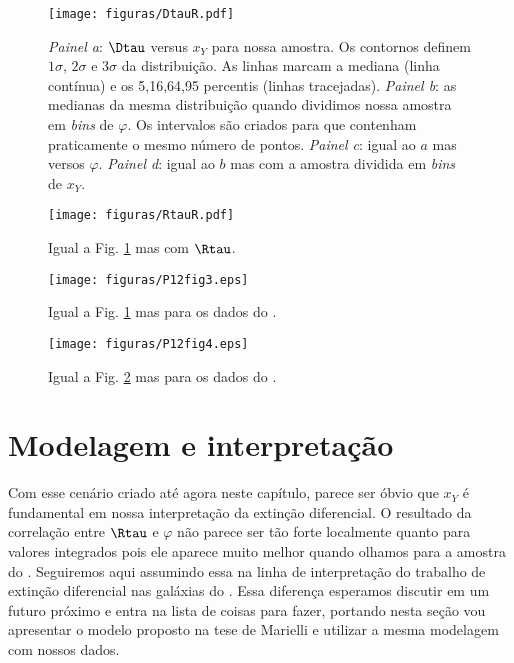\begin{figure}
	\centering
	\texttt{[image: figuras/DtauR.pdf]}
	\caption[$\Dtau$, $x_Y$ e $\varphi$]
	{\emph{Painel a}: $\Dtau$ versus $x_Y$ para nossa amostra. Os contornos definem
$1\sigma$, $2\sigma$ e $3\sigma$ da distribuição. As linhas marcam a mediana (linha contínua) e os
5,16,64,95 percentis (linhas tracejadas). \emph{Painel b}: as medianas da mesma distribuição
quando dividimos nossa amostra em {\em bins} de $\varphi$. Os intervalos são criados para que contenham
praticamente o mesmo número de pontos. \emph{Painel c}: igual ao $a$ mas versos
$\varphi$. \emph{Painel d}: igual ao $b$ mas com a amostra dividida em {\em bins} de $x_Y$.}
	\label{fig:Dtau}
\end{figure}

\begin{figure}
	\centering
	\texttt{[image: figuras/RtauR.pdf]}
	\caption[$\Rtau$, $x_Y$ e $\varphi$]
	{Igual a Fig. \ref{fig:Dtau} mas com $\Rtau$.}
	\label{fig:Rtau}
\end{figure}

\begin{figure}
	\centering
	\texttt{[image: figuras/P12fig3.eps]}
	\caption[$\Dtau$, $x_Y$ e $\varphi$ no \SDSS]
	{Igual a Fig. \ref{fig:Dtau} mas para os dados do \SDSS.}
	\label{fig:DtauSDSS}
\end{figure}

\begin{figure}
	\centering
	\texttt{[image: figuras/P12fig4.eps]}
	\caption[$\Rtau$, $x_Y$ e $\varphi$ no \SDSS]
	{Igual a Fig. \ref{fig:Rtau} mas para os dados do \SDSS.}
	\label{fig:RtauSDSS}
\end{figure}

\section{Modelagem e interpretação}
\label{sec:difextin:modeleinterp}

Com esse cenário criado até agora neste capítulo, parece ser óbvio que $x_Y$ é fundamental em nossa
interpretação da extinção diferencial. O resultado da correlação entre $\Rtau$ e $\varphi$
não parece ser tão forte localmente quanto para valores integrados pois ele aparece muito melhor
quando olhamos para a amostra do \SDSS. Seguiremos aqui assumindo essa na linha de interpretação do
trabalho de extinção diferencial nas galáxias do \SDSS. Essa diferença esperamos discutir em um
futuro próximo e entra na lista de coisas para fazer, portando nesta seção vou apresentar o modelo
proposto na tese de Marielli e utilizar a mesma modelagem com nossos dados.

